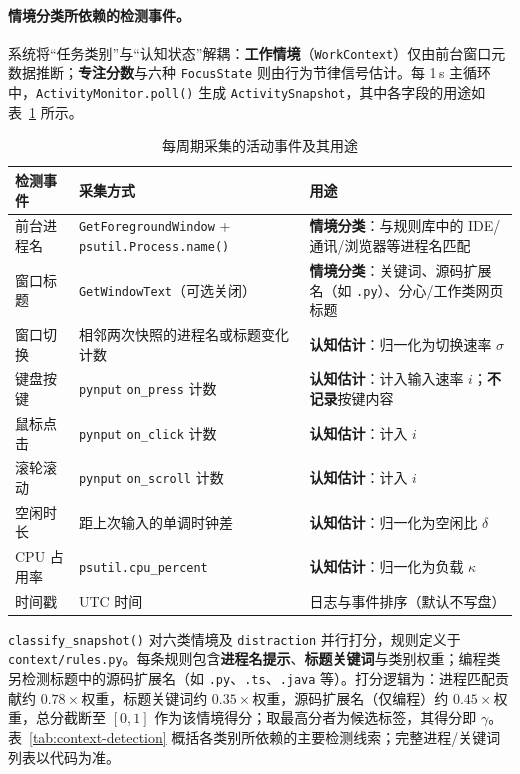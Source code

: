 \documentclass[12pt, fontset=windows]{ctexart}
\begin{document}
\paragraph{情境分类所依赖的检测事件。}系统将“任务类别”与“认知状态”解耦：\textbf{工作情境}（\texttt{WorkContext}）仅由前台窗口元数据推断；\textbf{专注分数}与六种 \texttt{FocusState} 则由行为节律信号估计。每 1\,s 主循环中，\texttt{ActivityMonitor.poll()} 生成 \texttt{ActivitySnapshot}，其中各字段的用途如表~\ref{tab:activity-snapshot} 所示。

\begin{table}[H]
\centering
\caption{每周期采集的活动事件及其用途}
\label{tab:activity-snapshot}
\small
\begin{tabular}{@{}p{3.0cm}p{4.0cm}p{5.8cm}@{}}
\toprule
\textbf{检测事件} & \textbf{采集方式} & \textbf{用途} \\
\midrule
前台进程名 & \texttt{GetForegroundWindow} + \texttt{psutil.Process.name()} & \textbf{情境分类}：与规则库中的 IDE/通讯/浏览器等进程名匹配 \\
窗口标题 & \texttt{GetWindowText}（可选关闭） & \textbf{情境分类}：关键词、源码扩展名（如 \texttt{.py}）、分心/工作类网页标题 \\
窗口切换 & 相邻两次快照的进程名或标题变化计数 & \textbf{认知估计}：归一化为切换速率 $\sigma$ \\
键盘按键 & \texttt{pynput} \texttt{on\_press} 计数 & \textbf{认知估计}：计入输入速率 $i$；\textbf{不记录}按键内容 \\
鼠标点击 & \texttt{pynput} \texttt{on\_click} 计数 & \textbf{认知估计}：计入 $i$ \\
滚轮滚动 & \texttt{pynput} \texttt{on\_scroll} 计数 & \textbf{认知估计}：计入 $i$ \\
空闲时长 & 距上次输入的单调时钟差 & \textbf{认知估计}：归一化为空闲比 $\delta$ \\
CPU 占用率 & \texttt{psutil.cpu\_percent} & \textbf{认知估计}：归一化为负载 $\kappa$ \\
时间戳 & UTC 时间 & 日志与事件排序（默认不写盘） \\
\bottomrule
\end{tabular}
\end{table}

\texttt{classify\_snapshot()} 对六类情境及 \texttt{distraction} 并行打分，规则定义于 \texttt{context/rules.py}。每条规则包含\textbf{进程名提示}、\textbf{标题关键词}与类别权重；编程类另检测标题中的源码扩展名（如 \texttt{.py}、\texttt{.ts}、\texttt{.java} 等）。打分逻辑为：进程匹配贡献约 $0.78\times$权重，标题关键词约 $0.35\times$权重，源码扩展名（仅编程）约 $0.45\times$权重，总分截断至 $[0,1]$ 作为该情境得分；取最高分者为候选标签，其得分即 $\gamma$。表~\ref{tab:context-detection} 概括各类别所依赖的主要检测线索；完整进程/关键词列表以代码为准。
\end{document}
